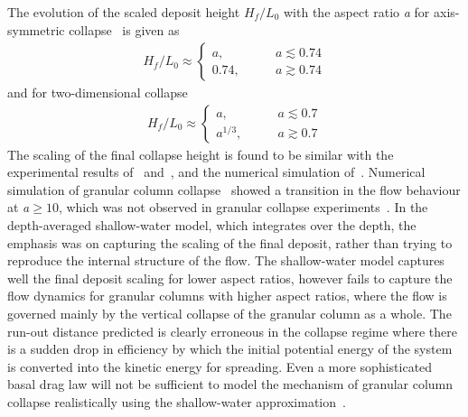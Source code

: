 The evolution of the scaled deposit height 
$\textit{H}_{\textit{f}}/\textit{L}_{\textit{0}}$ with the aspect ratio 
\textit{a} for axis-symmetric collapse~\citep{Lajeunesse2005} is given as 
\begin{align}
\textit{H}_{\textit{f}}/\textit{L}_{\textit{0}} \approx 
\begin{cases}
\textit{a}, \qquad &\textit{a}\lesssim 0.74 \\
0.74, \qquad &\textit{a}\gtrsim 0.74
\end{cases}
\end{align}
and for two-dimensional collapse
\begin{align}
\textit{H}_{\textit{f}}/\textit{L}_{\textit{0}} \approx 
\begin{cases}
\textit{a}, \qquad &\textit{a}\lesssim 0.7 \\
\textit{a}^{1/3}, \qquad &\textit{a}\gtrsim 0.7
\end{cases}
\end{align}
The scaling of the final collapse height is found to be similar with the 
experimental results of~\citet{Lube2005} and~\citet{Balmforth2005}, and the 
numerical simulation of~\citet{Staron2005}. Numerical simulation of granular 
column collapse~\citep{Lacaze2008,Staron2005} showed a transition in the flow 
behaviour at \textit{a}$\ge 10$, which was not observed in granular collapse 
experiments~\citep{Balmforth2005,Lube2005,Lajeunesse2004}. In the 
depth-averaged shallow-water model, which integrates over the depth, the 
emphasis was on capturing the scaling of the final deposit, rather than trying 
to reproduce the internal structure of the flow. The shallow-water model 
captures well the final deposit scaling for lower aspect ratios, however fails 
to capture the flow dynamics for granular columns with higher aspect ratios, 
where the flow is governed mainly by the vertical collapse of the granular 
column as a whole. The run-out distance predicted is clearly erroneous in the 
collapse regime where there is a sudden drop in efficiency by which the initial 
potential energy of the system is converted into the kinetic energy for 
spreading. Even a more sophisticated basal drag law will not be sufficient to 
model the mechanism of granular column collapse realistically using the 
shallow-water approximation~\citep{Kerswell2005}.


